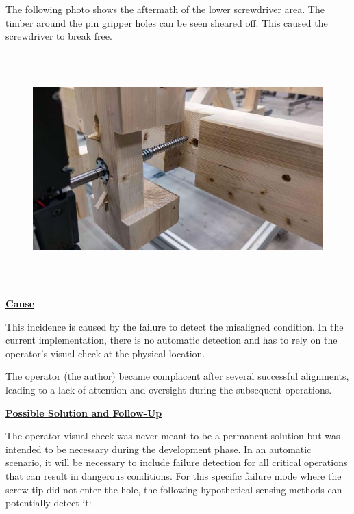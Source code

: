 \documentclass[11pt]{book}
\begin{document}
The following photo shows the aftermath of the lower screwdriver area. The timber around the pin gripper holes can be seen sheared off. This caused the screwdriver to break free.

\begin{figure}[H]
\includegraphics[width=15.92cm,height=8.96cm]{./images/image106.jpeg}
\end{figure}


\textbf{\uline{Cause}}

This incidence is caused by the failure to detect the misaligned condition. In the current implementation, there is no automatic detection and has to rely on the operator’s visual check at the physical location. 

The operator (the author) became complacent after several successful alignments, leading to a lack of attention and oversight during the subsequent operations.

\textbf{\uline{Possible Solution and Follow-Up}}

The operator visual check was never meant to be a permanent solution but was intended to be necessary during the development phase. In an automatic scenario, it will be necessary to include failure detection for all critical operations that can result in dangerous conditions. For this specific failure mode where the screw tip did not enter the hole, the following hypothetical sensing methods can potentially detect it:
\end{document}
